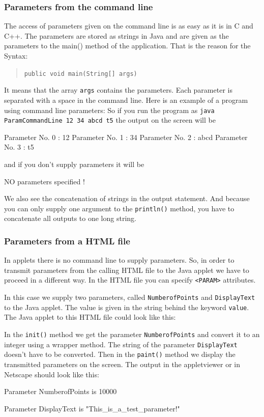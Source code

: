 \subsubsection{Parameters from the command line}
The access of parameters given on the command line is as easy as it
is in C and C++. The parameters are stored as strings in Java and
are given as the parameters to the main() method of the application.
That is the reason for the Syntax:
\begin{quotation}
  \verb|public void main(String[] args) |
\end{quotation}
It means that the array \verb|args| contains the parameters. Each parameter
is separated with a space in the command line. Here is an example of a 
program using command line parameters:
So if you run the program as \verb|java ParamCommandLine 12 34 abcd t5|
the output on the screen will be
\begin{sverbatim}
 Parameter No. 0 : 12
 Parameter No. 1 : 34
 Parameter No. 2 : abcd
 Parameter No. 3 : t5
\end{sverbatim}
and if you don't supply parameters it will be
\begin{sverbatim}
 NO parameters specified !
\end{sverbatim}
We also see the concatenation of strings in the output statement.
And because you can only supply one argument to the  \verb|println()|
method, you have to concatenate all outputs to one long string.

\subsubsection{Parameters from a HTML file}
In applets there is no command line to supply parameters. 
So, in order to transmit 
parameters from the calling HTML file to the Java applet we have to
proceed in a different way.
In the HTML file you can
specify \verb|<PARAM>| attributes.

In this case we supply two parameters, called \verb|NumberofPoints| and
\verb|DisplayText| to the Java applet. The value is given in the string
behind the keyword \verb|value|. The Java applet to this HTML file
could look like this:

In the \verb|init()| method we get the parameter \verb|NumberofPoints|
and convert it to an integer using a wrapper method. The string 
of the parameter \verb|DisplayText| doesn't have
to be converted. Then in the \verb|paint()| method we display
the transmitted parameters on the screen. The output in the 
appletviewer or in Netscape should look like this:
\begin{sverbatim}
  Parameter NumberofPoints is 10000

  Parameter DisplayText is "This_is_a_test_parameter!"
\end{sverbatim}




